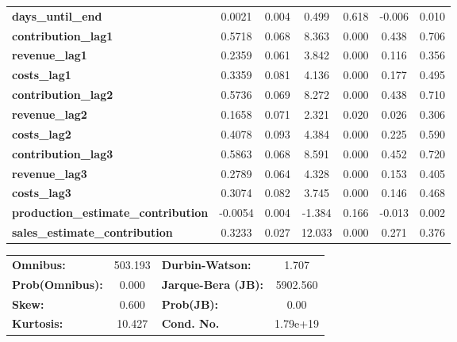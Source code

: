 \begin{center}
\begin{tabular}{lcccccc}
\textbf{days\_until\_end}                   &       0.0021  &        0.004     &     0.499  &         0.618        &       -0.006    &        0.010     \\
\textbf{contribution\_lag1}                 &       0.5718  &        0.068     &     8.363  &         0.000        &        0.438    &        0.706     \\
\textbf{revenue\_lag1}                      &       0.2359  &        0.061     &     3.842  &         0.000        &        0.116    &        0.356     \\
\textbf{costs\_lag1}                        &       0.3359  &        0.081     &     4.136  &         0.000        &        0.177    &        0.495     \\
\textbf{contribution\_lag2}                 &       0.5736  &        0.069     &     8.272  &         0.000        &        0.438    &        0.710     \\
\textbf{revenue\_lag2}                      &       0.1658  &        0.071     &     2.321  &         0.020        &        0.026    &        0.306     \\
\textbf{costs\_lag2}                        &       0.4078  &        0.093     &     4.384  &         0.000        &        0.225    &        0.590     \\
\textbf{contribution\_lag3}                 &       0.5863  &        0.068     &     8.591  &         0.000        &        0.452    &        0.720     \\
\textbf{revenue\_lag3}                      &       0.2789  &        0.064     &     4.328  &         0.000        &        0.153    &        0.405     \\
\textbf{costs\_lag3}                        &       0.3074  &        0.082     &     3.745  &         0.000        &        0.146    &        0.468     \\
\textbf{production\_estimate\_contribution} &      -0.0054  &        0.004     &    -1.384  &         0.166        &       -0.013    &        0.002     \\
\textbf{sales\_estimate\_contribution}      &       0.3233  &        0.027     &    12.033  &         0.000        &        0.271    &        0.376     \\
\bottomrule
\end{tabular}
\begin{tabular}{lclc}
\textbf{Omnibus:}       & 503.193 & \textbf{  Durbin-Watson:     } &    1.707  \\
\textbf{Prob(Omnibus):} &   0.000 & \textbf{  Jarque-Bera (JB):  } & 5902.560  \\
\textbf{Skew:}          &   0.600 & \textbf{  Prob(JB):          } &     0.00  \\
\textbf{Kurtosis:}      &  10.427 & \textbf{  Cond. No.          } & 1.79e+19  \\
\bottomrule
\end{tabular}
\end{center}

